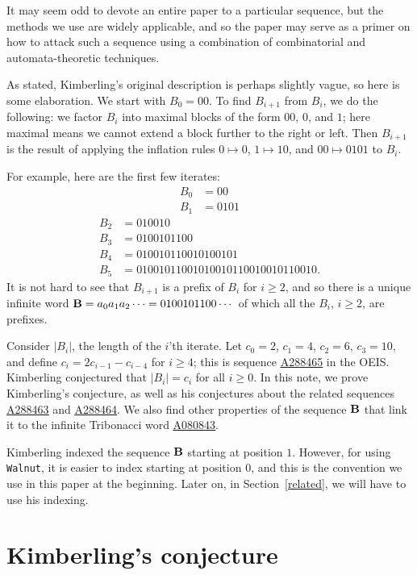 \documentclass[
final
]{dmtcs-episciences}
\newcommand{\seqnum}[1]{\href{https://oeis.org/#1}{\rm \underline{#1}}}
\theoremstyle{plain}
\theoremstyle{definition}
\theoremstyle{remark}
\begin{document}
It may seem odd to devote an entire paper to a particular sequence, but the methods we use are widely applicable, and so the paper may serve as a primer on how to attack such a sequence using a combination of combinatorial and automata-theoretic techniques.  

As stated, Kimberling's original description is perhaps slightly vague,
so here is some elaboration.   We start
with $B_0 = 00$.  To find $B_{i+1}$ from $B_i$, we do the following:  we
factor $B_i$ into maximal blocks of the form $00$, $0$, and $1$; here maximal
means we cannot extend a block further to the right or left.  Then 
$B_{i+1}$ is the result of applying
the inflation rules $0 \mapsto 0$, $1 \mapsto 10$, and $00 \mapsto
0101$ to $B_i$.

For example, here are the first few iterates:
\begin{align*}
B_0 &= 00 \\
B_1 &= 0101 
\end{align*}
\begin{align*}
B_2 &= 010010 \\
B_3 &= 0100101100 \\
B_4 &= 010010110010100101 \\
B_5 &= 01001011001010010110010010110010 .
\end{align*}
It is not hard to see that $B_{i+1}$ is a prefix of $B_i$ for $i \geq 2$,
and so there is a unique infinite word ${\bf B} = a_0 a_1 a_2 \cdots =
0100101100\cdots$ 
of which all the $B_i$, $i \geq 2$, are prefixes.

Consider $|B_i|$, the length of the $i$'th iterate.
Let $c_0 = 2$, $c_1 = 4$, $c_2 = 6$, $c_3 = 10$, and
define $c_i = 2c_{i-1} - c_{i-4}$ for $i \geq 4$; this is
sequence \seqnum{A288465} in the OEIS.
Kimberling conjectured that $|B_i| = c_i$ for all $i \geq 0$.
In this note, we prove
Kimberling's conjecture, as well as his conjectures about the
related sequences \seqnum{A288463} and \seqnum{A288464}.
We also find other properties of the sequence ${\bf B}$ that
link it to the infinite Tribonacci word \seqnum{A080843}.

Kimberling indexed the sequence ${\bf B}$ starting at position $1$.
However, for using {\tt Walnut}, it is easier to index starting
at position $0$, and this is the convention we use in this paper
at the beginning.  Later on, in Section~\ref{related}, we will have to use his indexing.


\section{Kimberling's conjecture}
\end{document}
